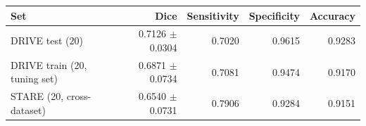 \begin{tabular}{lrrrr}
\toprule
Set & Dice & Sensitivity & Specificity & Accuracy \\
\midrule
DRIVE test (20) & 0.7126 $\pm$ 0.0304 & 0.7020 & 0.9615 & 0.9283 \\
DRIVE train (20, tuning set) & 0.6871 $\pm$ 0.0734 & 0.7081 & 0.9474 & 0.9170 \\
STARE (20, cross-dataset) & 0.6540 $\pm$ 0.0731 & 0.7906 & 0.9284 & 0.9151 \\
\bottomrule
\end{tabular}
